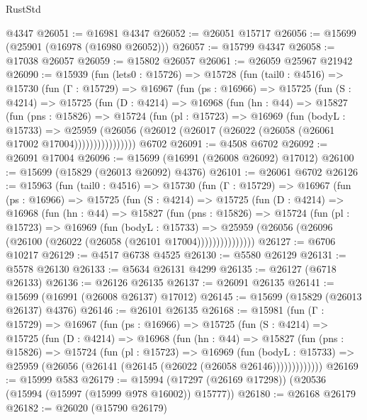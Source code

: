\begin{lexlean}{RustStd}
\begin{coremodule}
    @4347
@26051 := @16981 @4347
@26052 := @26051 @15717
@26056 := @15699 (@25901 (@16978 (@16980 @26052)))
@26057 := @15799 @4347
@26058 := @17038 @26057
@26059 := @15802 @26057
@26061 := @26059 @25967 @21942
@26090 := @15939
    (fun (lets0 : @15726) =>
    @15728
      (fun (tail0 : @4516) =>
      @15730
        (fun (Γ : @15729) =>
        @16967
          (fun (ps : @16966) =>
          @15725
            (fun (S : @4214) =>
            @15725
              (fun (D : @4214) =>
              @16968
                (fun (hn : @44) =>
                @15827
                  (fun (pns : @15826) =>
                  @15724
                    (fun (pl : @15723) =>
                    @16969
                      (fun (bodyL : @15733) =>
                      @25959
                        (@26056
                          (@26012 (@26017 (@26022 (@26058 (@26061 @17002 @17004))))))))))))))))
    @6702
@26091 := @4508 @6702
@26092 := @26091 @17004
@26096 := @15699 (@16991 (@26008 @26092) @17012)
@26100 := @15699 (@15829 (@26013 @26092) @4376)
@26101 := @26061 @6702
@26126 := @15963
    (fun (tail0 : @4516) =>
    @15730
      (fun (Γ : @15729) =>
      @16967
        (fun (ps : @16966) =>
        @15725
          (fun (S : @4214) =>
          @15725
            (fun (D : @4214) =>
            @16968
              (fun (hn : @44) =>
              @15827
                (fun (pns : @15826) =>
                @15724
                  (fun (pl : @15723) =>
                  @16969
                    (fun (bodyL : @15733) =>
                    @25959 (@26056 (@26096 (@26100 (@26022 (@26058 (@26101 @17004)))))))))))))))
@26127 := @6706 @10217
@26129 := @4517 @6738 @4525
@26130 := @5580 @26129
@26131 := @5578 @26130
@26133 := @5634 @26131 @4299
@26135 := @26127 (@6718 @26133)
@26136 := @26126 @26135
@26137 := @26091 @26135
@26141 := @15699 (@16991 (@26008 @26137) @17012)
@26145 := @15699 (@15829 (@26013 @26137) @4376)
@26146 := @26101 @26135
@26168 := @15981
    (fun (Γ : @15729) =>
    @16967
      (fun (ps : @16966) =>
      @15725
        (fun (S : @4214) =>
        @15725
          (fun (D : @4214) =>
          @16968
            (fun (hn : @44) =>
            @15827
              (fun (pns : @15826) =>
              @15724
                (fun (pl : @15723) =>
                @16969
                  (fun (bodyL : @15733) =>
                  @25959 (@26056 (@26141 (@26145 (@26022 (@26058 @26146)))))))))))))
@26169 := @15999 @583
@26179 := @15994 (@17297 (@26169 @17298)) (@20536 (@15994 (@15997 (@15999 @978 @16002)) @15777))
@26180 := @26168 @26179
@26182 := @26020 (@15790 @26179)

\end{coremodule}
\end{lexlean}
